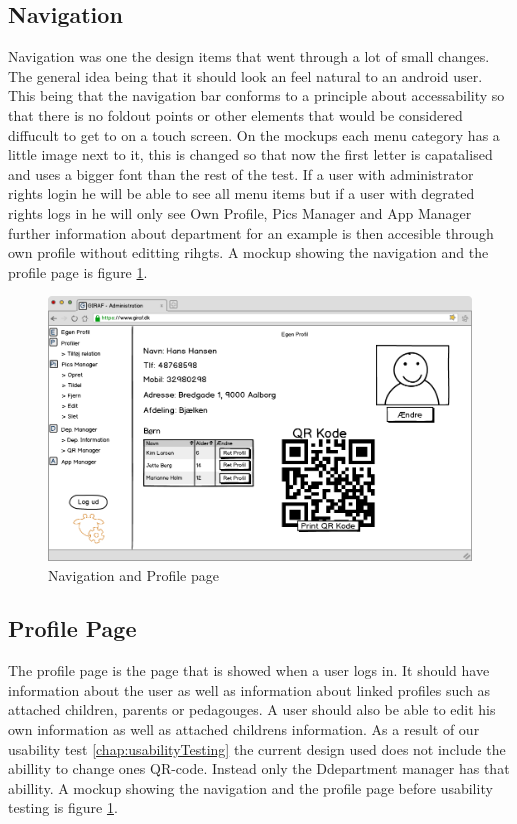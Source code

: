 \subsection{Navigation}
Navigation was one the design items that went through a lot of small changes. The general idea being that it should look an feel natural to an android user. This being that the navigation bar conforms to a principle about accessability so that there is no foldout points or other elements that would be considered diffucult to get to on a touch screen. On the mockups each menu category has a little image next to it, this is changed so that now the first letter is capatalised and uses a bigger font than the rest of the test. If a user with administrator rights login he will be able to see all menu items but if a user with degrated rights logs in he will only see Own Profile, Pics Manager and App Manager further information about  department for an example is then accesible through own profile without editting rihgts.  A mockup showing the navigation and the profile page is figure \ref{fig:own_profileDesign}.
\begin{figure}[p]
\centering
\includegraphics[width=1\textwidth]{images/mockup/egenProfil.png}
\caption{Navigation and Profile page}
\label{fig:own_profileDesign}
\end{figure}

\subsection{Profile Page}
The profile page is the page that is showed when a user logs in. It should have information about the user as well as information about linked profiles such as attached children, parents or pedagouges. A user should also be able to edit his own information as well as attached childrens information. As a result of our usability test \ref{chap:usabilityTesting} the current design used does not include the abillity to change ones QR-code. Instead only the Ddepartment manager has that abillity. A mockup showing the navigation and the profile page before usability testing is figure \ref{fig:own_profileDesign}.

